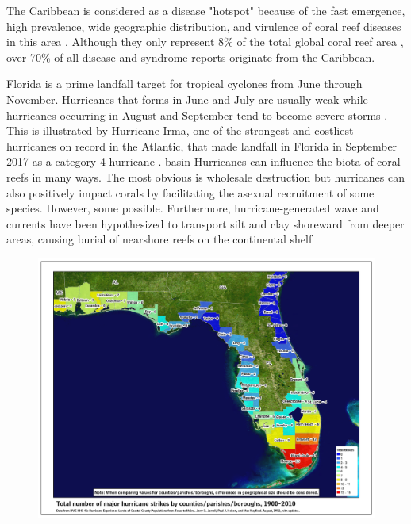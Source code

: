 \documentclass[12pt ,a4paper]{article}
\begin{document}
The Caribbean is considered as a disease "hotspot" because of the fast emergence, high prevalence, wide geographic distribution, and virulence of coral reef diseases in this area \citep{harvell2007coral}. Although they only represent 8\% of the total global coral reef area \citep{spalding1997new}, over 70\% of all disease and syndrome reports originate from the Caribbean.

Florida is a prime landfall target for tropical cyclones from June through November. Hurricanes that forms in June and July are usually weak while hurricanes occurring in August and September tend to become severe storms \citep{banks2008reef}. This is illustrated by Hurricane Irma, one of the strongest and costliest hurricanes on record in the Atlantic, that made landfall in Florida in September 2017 as a category 4 hurricane \citep{irmaNOAA, xian2018brief}. basin Hurricanes can influence the biota of coral reefs in many ways. The most obvious is wholesale destruction but hurricanes can also positively impact corals by facilitating the asexual recruitment of some species. However, some possible. Furthermore, hurricane-generated wave and currents have been hypothesized to transport silt and clay shoreward from deeper areas, causing burial of nearshore reefs on the continental shelf \citep{miller2008effects}

\begin{figure}
    \centering
    \includegraphics[width=\textwidth]{figures/hurricane_strikes.jpg}
    \caption{}
    \label{inro:landfall}
\end{figure}



 

\end{document}
